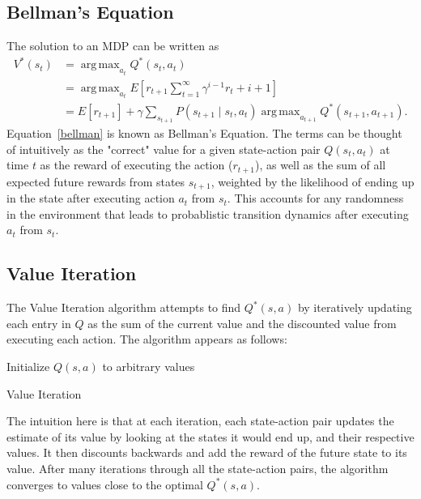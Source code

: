 \documentclass{amsart}
\DeclareMathOperator*{\argmax}{arg\,max}
\begin{document}
    \subsection{Bellman's Equation}
    The solution to an MDP can be written as
    \begin{align}
        V^*(s_t)
        &= \argmax_{a_t} Q^*(s_t, a_t) \\
        &= \argmax_{a_t} E[r_{t+1} \sum_{t=1}^\infty \gamma^{i-1} r_t + i + 1] \\
        &= E[r_{t+1}] + \gamma \sum_{s_{t+1}} P(s_{t+1} \mid s_t, a_t) \argmax_{a_{t+1}} Q^*(s_{t+1}, a_{t+1}).
        \label{bellman}
    \end{align}
    Equation~\ref{bellman} is known as Bellman's Equation. The terms can be thought of intuitively as
    the "correct" value for a given state-action pair $Q(s_t, a_t)$ at time $t$ as the reward of executing
    the action ($r_{t+1}$), as well as the sum of all expected future rewards from states $s_{t+1}$,
    weighted by the likelihood of ending up in the state after executing action $a_t$ from $s_t$. This
    accounts for any randomness in the environment that leads to probablistic transition dynamics after
    executing $a_t$ from $s_t$.


    \subsection{Value Iteration}
    The Value Iteration algorithm\cite{value_iteration} attempts to find
    $Q^*(s, a)$ by iteratively updating each entry in $Q$ as the sum of the current value and the discounted value
    from executing each action. The algorithm appears as follows:

    \begin{algorithm}[H]
    \SetAlgoLined
         Initialize $Q(s, a)$ to arbitrary values\;
     \caption{Value Iteration}
    \label{value_iteration_algorithm}
    \end{algorithm}


    The intuition here is that at each iteration, each state-action pair updates the estimate of its value by looking
    at the states it would end up, and their respective values. It then discounts backwards and add the reward of the
    future state to its value. After many iterations through all the state-action pairs, the algorithm converges
    to values close to the optimal $Q^*(s, a)$.
\end{document}
